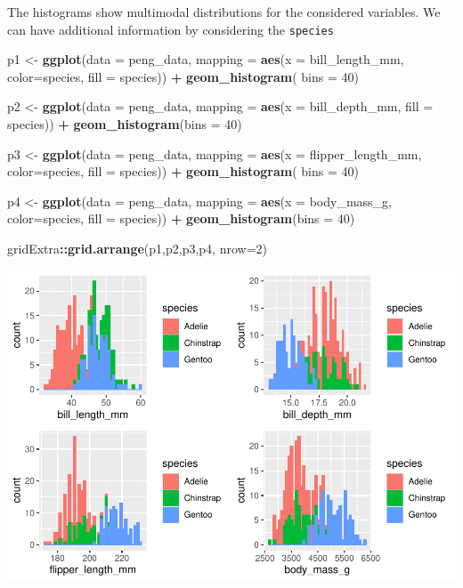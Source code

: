 \documentclass[
]{article}
\newenvironment{Shaded}{\begin{snugshade}}{\end{snugshade}}
\newcommand{\AttributeTok}[1]{\textcolor[rgb]{0.13,0.29,0.53}{#1}}
\newcommand{\DecValTok}[1]{\textcolor[rgb]{0.00,0.00,0.81}{#1}}
\newcommand{\FunctionTok}[1]{\textcolor[rgb]{0.13,0.29,0.53}{\textbf{#1}}}
\newcommand{\NormalTok}[1]{#1}
\newcommand{\OtherTok}[1]{\textcolor[rgb]{0.56,0.35,0.01}{#1}}
\newcommand{\SpecialCharTok}[1]{\textcolor[rgb]{0.81,0.36,0.00}{\textbf{#1}}}
\begin{document}
The histograms show multimodal distributions for the considered
variables. We can have additional information by considering the
\texttt{species}

\begin{Shaded}
\begin{Highlighting}[]
\NormalTok{p1 }\OtherTok{\textless{}{-}} \FunctionTok{ggplot}\NormalTok{(}\AttributeTok{data =}\NormalTok{ peng\_data, }\AttributeTok{mapping =} \FunctionTok{aes}\NormalTok{(}\AttributeTok{x =}\NormalTok{ bill\_length\_mm, }\AttributeTok{color=}\NormalTok{species, }\AttributeTok{fill =}\NormalTok{  species)) }\SpecialCharTok{+} 
  \FunctionTok{geom\_histogram}\NormalTok{( }\AttributeTok{bins =} \DecValTok{40}\NormalTok{)}

\NormalTok{p2 }\OtherTok{\textless{}{-}} \FunctionTok{ggplot}\NormalTok{(}\AttributeTok{data =}\NormalTok{ peng\_data, }\AttributeTok{mapping =} \FunctionTok{aes}\NormalTok{(}\AttributeTok{x =}\NormalTok{ bill\_depth\_mm, }\AttributeTok{fill =}\NormalTok{  species)) }\SpecialCharTok{+} 
  \FunctionTok{geom\_histogram}\NormalTok{(}\AttributeTok{bins =} \DecValTok{40}\NormalTok{)}

\NormalTok{p3 }\OtherTok{\textless{}{-}} \FunctionTok{ggplot}\NormalTok{(}\AttributeTok{data =}\NormalTok{ peng\_data, }\AttributeTok{mapping =} \FunctionTok{aes}\NormalTok{(}\AttributeTok{x =}\NormalTok{ flipper\_length\_mm, }\AttributeTok{color=}\NormalTok{species, }\AttributeTok{fill =}\NormalTok{  species)) }\SpecialCharTok{+} 
  \FunctionTok{geom\_histogram}\NormalTok{( }\AttributeTok{bins =} \DecValTok{40}\NormalTok{)}

\NormalTok{p4 }\OtherTok{\textless{}{-}} \FunctionTok{ggplot}\NormalTok{(}\AttributeTok{data =}\NormalTok{ peng\_data, }\AttributeTok{mapping =} \FunctionTok{aes}\NormalTok{(}\AttributeTok{x =}\NormalTok{ body\_mass\_g, }\AttributeTok{color=}\NormalTok{species, }\AttributeTok{fill =}\NormalTok{  species)) }\SpecialCharTok{+} 
  \FunctionTok{geom\_histogram}\NormalTok{(}\AttributeTok{bins =} \DecValTok{40}\NormalTok{)}

\NormalTok{gridExtra}\SpecialCharTok{::}\FunctionTok{grid.arrange}\NormalTok{(p1,p2,p3,p4, }\AttributeTok{nrow=}\DecValTok{2}\NormalTok{)}
\end{Highlighting}
\end{Shaded}

\includegraphics{EDA_files/figure-latex/unnamed-chunk-30-1.pdf}
\end{document}
